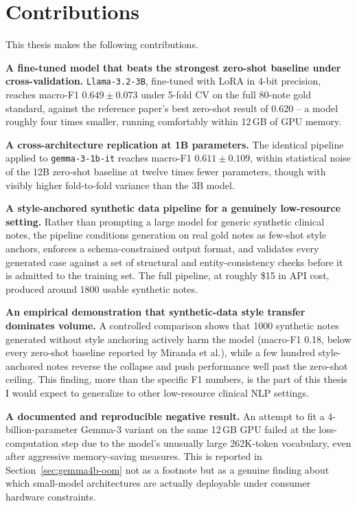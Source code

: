\documentclass[12pt,a4paper]{report}
\begin{document}
\section{Contributions}

This thesis makes the following contributions.

\textbf{A fine-tuned model that beats the strongest zero-shot baseline under cross-validation.} \texttt{Llama-3.2-3B}, fine-tuned with LoRA in 4-bit precision, reaches macro-F1 $0.649 \pm 0.073$ under 5-fold CV on the full 80-note gold standard, against the reference paper's best zero-shot result of 0.620 -- a model roughly four times smaller, running comfortably within 12\,GB of GPU memory.

\textbf{A cross-architecture replication at 1B parameters.} The identical pipeline applied to \texttt{gemma-3-1b-it} reaches macro-F1 $0.611 \pm 0.109$, within statistical noise of the 12B zero-shot baseline at twelve times fewer parameters, though with visibly higher fold-to-fold variance than the 3B model.

\textbf{A style-anchored synthetic data pipeline for a genuinely low-resource setting.} Rather than prompting a large model for generic synthetic clinical notes, the pipeline conditions generation on real gold notes as few-shot style anchors, enforces a schema-constrained output format, and validates every generated case against a set of structural and entity-consistency checks before it is admitted to the training set. The full pipeline, at roughly \$15 in API cost, produced around 1800 usable synthetic notes.

\textbf{An empirical demonstration that synthetic-data style transfer dominates volume.} A controlled comparison shows that 1000 synthetic notes generated without style anchoring actively harm the model (macro-F1 0.18, below every zero-shot baseline reported by Miranda et al.), while a few hundred style-anchored notes reverse the collapse and push performance well past the zero-shot ceiling. This finding, more than the specific F1 numbers, is the part of this thesis I would expect to generalize to other low-resource clinical NLP settings.

\textbf{A documented and reproducible negative result.} An attempt to fit a 4-billion-parameter Gemma-3 variant on the same 12\,GB GPU failed at the loss-computation step due to the model's unusually large 262K-token vocabulary, even after aggressive memory-saving measures. This is reported in Section~\ref{sec:gemma4b-oom} not as a footnote but as a genuine finding about which small-model architectures are actually deployable under consumer hardware constraints.
\end{document}
